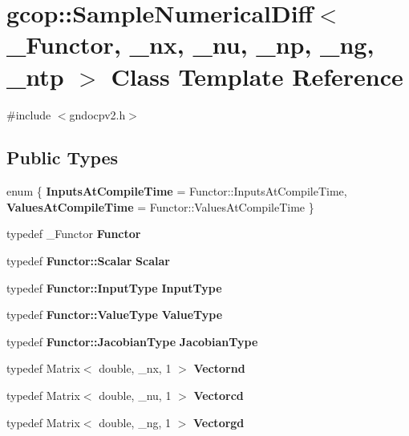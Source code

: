 \section{gcop\-:\-:\-Sample\-Numerical\-Diff$<$ \-\_\-\-Functor, \-\_\-nx, \-\_\-nu, \-\_\-np, \-\_\-ng, \-\_\-ntp $>$ \-Class \-Template \-Reference}
\label{classgcop_1_1SampleNumericalDiff}


{\ttfamily \#include $<$gndocpv2.\-h$>$}

\subsection*{\-Public \-Types}
\begin{DoxyCompactItemize}
\item 
enum \{ {\bf \-Inputs\-At\-Compile\-Time} =  \-Functor\-:\-:\-Inputs\-At\-Compile\-Time, 
{\bf \-Values\-At\-Compile\-Time} =  \-Functor\-:\-:\-Values\-At\-Compile\-Time
 \}
\item 
typedef \-\_\-\-Functor {\bf \-Functor}
\item 
typedef {\bf \-Functor\-::\-Scalar} {\bf \-Scalar}
\item 
typedef {\bf \-Functor\-::\-Input\-Type} {\bf \-Input\-Type}
\item 
typedef {\bf \-Functor\-::\-Value\-Type} {\bf \-Value\-Type}
\item 
typedef {\bf \-Functor\-::\-Jacobian\-Type} {\bf \-Jacobian\-Type}
\item 
typedef \-Matrix$<$ double, \-\_\-nx, 1 $>$ {\bf \-Vectornd}
\item 
typedef \-Matrix$<$ double, \-\_\-nu, 1 $>$ {\bf \-Vectorcd}
\item 
typedef \-Matrix$<$ double, \-\_\-ng, 1 $>$ {\bf \-Vectorgd}
\end{DoxyCompactItemize}
